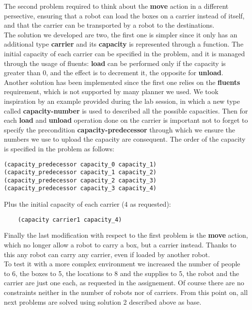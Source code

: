 The second problem required to think about the \textbf{move} action in a different persective, 
ensuring that a robot can load the boxes on a carrier instead of itself, and that the carrier can be transported by a robot to the destinations.\\
The solution we developed are two, the first one is simpler since it only has an additional type \textbf{carrier} and its \textbf{capacity} is represented through a function.
The initial capacity of each carrier can be specified in the problem, and it is managed through the usage of fluents: \textbf{load} can be performed only if the capacity is greater than 0, and the effect is to decrement it, the opposite for \textbf{unload}.\\
Another solution has been implemented since the first one relies on the \textbf{fluents} requirement, which is not supported by many planner we used.
We took inspiration by an example provided during the lab session, in which a new type called \textbf{capacity-number} is used to described all the possible capacities.
Then for each \textbf{load} and \textbf{unload} operation done on the carrier is important not to forget to specify the precondition \textbf{capacity-predecessor} through which we ensure the numbers we use to upload the capacity are consequent.
The order of the capacity is specified in the problem as follows:
\begin{verbatim}
(capacity_predecessor capacity_0 capacity_1)
(capacity_predecessor capacity_1 capacity_2)
(capacity_predecessor capacity_2 capacity_3)
(capacity_predecessor capacity_3 capacity_4)
\end{verbatim}
Plus the initial capacity of each carrier (4 as requested):
\begin{verbatim}
    (capacity carrier1 capacity_4)
\end{verbatim}
Finally the last modification with respect to the first problem is the \textbf{move} action, which no longer allow a robot to carry a box, but a carrier instead.
Thanks to this any robot can carry any carrier, even if loaded by another robot.\\
To test it with a more complex environment we increased the number of people to 6, the boxes to 5, the locations to 8 and the supplies to 5, the robot and the carrier are just one each, as requested in the assignement.
Of course there are no constraints neither in the number of robots nor of carriers.
From this point on, all next problems are solved using solution 2 described above as base.